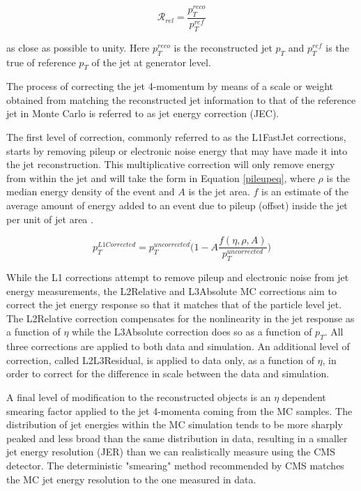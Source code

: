 \begin{equation}
\mathcal{R}_{rel} = \frac{p_{T}^{reco}}{p_{T}^{ref}} 
\end{equation}

as close as possible to unity. Here $p_{T}^{reco}$ is the reconstructed jet $p_{T}$ and $p_{T}^{ref}$ is the true of reference $p_{T}$ of the jet at generator level. 

The process of correcting the jet 4-momentum by means of a scale or weight obtained from matching the reconstructed jet information to that of the reference jet in Monte Carlo is referred to as jet energy correction (JEC).

The first level of correction, commonly referred to as the L1FastJet\cite{Cacciari2007} corrections, starts by removing pileup or electronic noise energy that may have made it into the jet reconstruction. This multiplicative correction will only remove energy from within the jet and will take the form in Equation \ref{pileupeq}, where $\rho$ is the median energy density of the event and $A$ is the jet area. $f$ is an estimate of the average amount of energy added to an event due to pileup (offset) inside the jet per unit of jet area \cite{JINST2011,Cacciari2007}.

\begin{equation}
\label{pileupeq}
p_{T}^{L1Corrected} = p_{T}^{uncorrected}\dot(1 - A\frac{f(\eta,\rho,A)}{p_{T}^{uncorrected}})
\end{equation}

While the L1 corrections attempt to remove pileup and electronic noise from jet energy measurements, the L2Relative and L3Absolute MC corrections aim to correct the jet energy response so that it matches that of the particle level jet. The L2Relative correction compensates for the nonlinearity in the jet response as a function of $\eta$ while the L3Absolute correction does so as a function of $p_{T}$. All three corrections are applied to both data and simulation. An additional level of correction, called L2L3Residual, is applied to data only, as a function of $\eta$, in order to correct for the difference in scale between the data and simulation.

A final level of modification to the reconstructed objects is an $\eta$ dependent smearing factor applied to the jet 4-momenta coming from the MC samples. The distribution of jet energies within the MC simulation tends to be more sharply peaked and less broad than the same distribution in data, resulting in a smaller jet energy resolution (JER) than we can realistically measure using the CMS detector. The deterministic "smearing" method recommended by CMS\cite{JetEnergyResolutionTwiki} matches the MC jet energy resolution to the one measured in data. 

